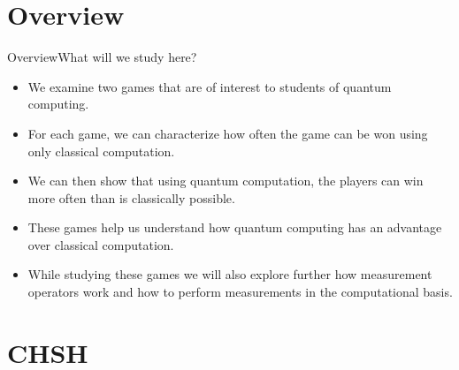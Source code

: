 
\section*{Overview}

\begin{frame}{Overview}{What will we study here?}
\begin{itemize}[<+->]
  \item We examine two games that are of interest to students of quantum
computing.
  \item For each game, we can characterize how often the game can be won
using only classical computation.
   \item We can then show that using quantum computation, the players can
win more often than is classically possible.
   \item These games help us understand how quantum computing has an
advantage over classical computation.
   \item While studying these games we will also explore further how
measurement operators work and how to perform measurements in the
computational basis.
\end{itemize}
\end{frame}

\section*{CHSH}

